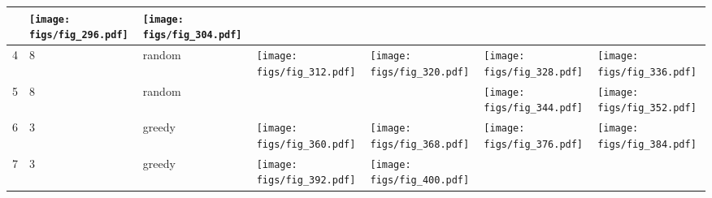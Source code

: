 \documentclass[oneside,canadian,landscape]{article}
\begin{document}
\begin{center}
\begin{longtable}{|l|l|l||l|l|l|l|}
\begin{minipage}{3.5cm}
\end{minipage}
&\begin{minipage}{3.5cm}
\texttt{[image: figs/fig\_296.pdf]}
\end{minipage}
&\begin{minipage}{3.5cm}
\texttt{[image: figs/fig\_304.pdf]}
\end{minipage}
\\ \hline
4&8&random&\begin{minipage}{3.5cm}
\texttt{[image: figs/fig\_312.pdf]}
\end{minipage}
&\begin{minipage}{3.5cm}
\texttt{[image: figs/fig\_320.pdf]}
\end{minipage}
&\begin{minipage}{3.5cm}
\texttt{[image: figs/fig\_328.pdf]}
\end{minipage}
&\begin{minipage}{3.5cm}
\texttt{[image: figs/fig\_336.pdf]}
\end{minipage}
\\ \hline
5&8&random&&&\begin{minipage}{3.5cm}
\texttt{[image: figs/fig\_344.pdf]}
\end{minipage}
&\begin{minipage}{3.5cm}
\texttt{[image: figs/fig\_352.pdf]}
\end{minipage}
\\ \hline
6&3&greedy&\begin{minipage}{3.5cm}
\texttt{[image: figs/fig\_360.pdf]}
\end{minipage}
&\begin{minipage}{3.5cm}
\texttt{[image: figs/fig\_368.pdf]}
\end{minipage}
&\begin{minipage}{3.5cm}
\texttt{[image: figs/fig\_376.pdf]}
\end{minipage}
&\begin{minipage}{3.5cm}
\texttt{[image: figs/fig\_384.pdf]}
\end{minipage}
\\ \hline
7&3&greedy&\begin{minipage}{3.5cm}
\texttt{[image: figs/fig\_392.pdf]}
\end{minipage}
&\begin{minipage}{3.5cm}
\texttt{[image: figs/fig\_400.pdf]}
\end{minipage}

\end{longtable}
\end{center}
\end{document}
